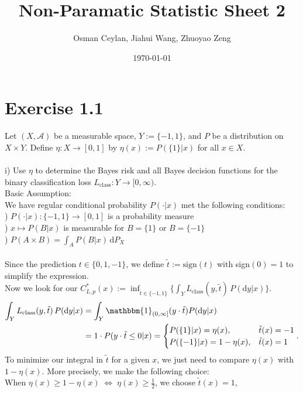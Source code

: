 \documentclass{article}
\title{Non-Paramatic Statistic Sheet 2}
\author{Osman Ceylan, Jiahui Wang, Zhuoyao Zeng}
\date{\today}
\begin{document}
\maketitle
\section*{Exercise 1.1}
Let $(X, \mathcal{A})$ be a measurable space, $Y := \{-1,1\}$, and $P$ be a distribution on $X \times Y$. Define $\eta: X \rightarrow [0,1]$ by $\eta(x) := P(\{1\}|x)$ for all $x \in X$.\\
 \\
i) Use $\eta$ to determine the Bayes risk and all Bayes decision functions for the binary classification loss $L_\text{class}:Y \rightarrow [0,\infty )$.\vspace{0.5em}\\
Basic Assumption:\\
We have regular conditional probability $P(\cdot|x)$ met the following conditions:\\ 
) $P(\cdot|x):\{-1,1\} \rightarrow [0,1]$ is a probability measure \\
) $x \mapsto P(B|x)$ is measurable for $B = \{1\}$ or $B = \{-1\}$ \\
) $P(A \times B) = \displaystyle{ \int_{A} P(B|x)\, \text{d}P_X  }$\\
 \\
Since the prediction $t \in \{0,1,-1\}$, we define $\tilde{t}:= \text{sign}(t)$ with sign$(0) = 1$ to simplify the expression. \\
Now we look for our $C^*_{L,p}(x):= \inf_{\tilde{t}\in \{-1,1\}}\{\displaystyle{ \int_{Y} L_\text{class}(y,\tilde{t})\, P(\text{d}y|x)} \}$.  
\begin{align*}
\displaystyle{ \int_{Y} L_\text{class}(y,\tilde{t})\, P(\text{d}y|x) }
 & = \displaystyle{ \int_{Y} \mathbbm{1}_{(0,\infty]}(y\cdot\tilde{t}) P(\text{d}y|x)} \\
 & = 1 \cdot P(y\cdot\tilde{t} \leq 0 | x) =  \begin{cases} P(\{1\}|x) = \eta(x), &\tilde{t}(x) = -1 \cr  P(\{-1\}|x) = 1- \eta(x), &\tilde{t}(x) = 1 \end{cases}.
\end{align*}
To minimize our integral in $\tilde{t}$ for a given $x$, we just need to compare $\eta(x)$ with $1 - \eta(x)$. More precisely, we make the following choice:\\
When $\eta(x) \geq 1-\eta(x) \; \Leftrightarrow \; \eta(x) \geq \frac{1}{2}$, we choose $\tilde{t}(x) = 1$,\\
\end{document}
